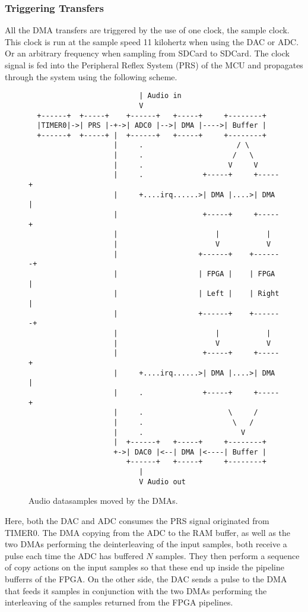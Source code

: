 \subsubsection{Triggering Transfers}

All the DMA transfers are triggered by the use of one clock, the sample clock.
This clock is run at the sample speed 11 kilohertz when using the DAC or ADC. Or
an arbitrary frequency when sampling from SDCard to SDCard. The clock signal is fed into
the Peripheral Reflex System  (PRS) of the MCU and propagates
through the system using the following scheme.

\begin{figure}[H]
  \begin{verbatim}
                          | Audio in
                          V
  +------+  +-----+    +------+   +-----+     +--------+
  |TIMER0|->| PRS |-+->| ADC0 |-->| DMA |---->| Buffer |
  +------+  +-----+ |  +------+   +-----+     +--------+
                    |     .                      / \
                    |     .                     /   \
                    |     .                    V     V
                    |     .              +-----+     +-----+
                    |     +....irq......>| DMA |....>| DMA |
                    |                    +-----+     +-----+
                    |                       |           |
                    |                       V           V
                    |                   +------+    +-------+
                    |                   | FPGA |    | FPGA  |
                    |                   | Left |    | Right |
                    |                   +------+    +-------+
                    |                       |           |
                    |                       V           V
                    |                    +-----+     +-----+
                    |     +....irq......>| DMA |....>| DMA |
                    |     .              +-----+     +-----+
                    |     .                    \     /
                    |     .                     \   /
                    |     .                       V
                    |  +------+   +-----+     +--------+
                    +->| DAC0 |<--| DMA |<----| Buffer |
                       +------+   +-----+     +--------+
                          |
                          V Audio out
  \end{verbatim}
  \caption{Audio datasamples moved by the DMAs.}
  \label{mcu:dma-dataflow}
\end{figure}

Here, both the DAC and ADC consumes the PRS signal originated from TIMER0. The
DMA copying from the ADC to the RAM buffer, as well as the two DMAs performing the
deinterleaving of the input samples, both receive a pulse each time the ADC has
buffered $N$ samples. They then perform a sequence of copy actions on the input
samples so that these end up inside the pipeline bufferrs of the FPGA. On the
other side, the DAC sends a pulse to the DMA that feeds it samples in conjunction
with the two DMAs performing the interleaving of the samples returned from the
FPGA pipelines.
